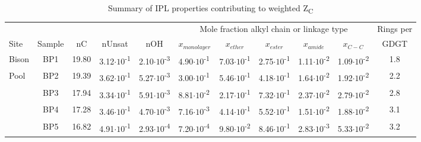 \begin{landscape}
\singlespace

\begin{table}
\centering
\normalsize
\begin{adjustbox}{width=600pt,keepaspectratio}
\begin{threeparttable}
  \caption{Summary of IPL properties contributing to weighted Z\textsubscript{C}}
  

\begin{tabular}{lccccllcccc}
\toprule
      &       &       &       &       & \multicolumn{5}{c}{Mole fraction alkyl chain or linkage type} & Rings per \\
\cmidrule{6-10}Site  & Sample & nC    & nUnsat & nOH   & \multicolumn{1}{c}{$x_{monolayer}$} & \multicolumn{1}{c}{$x_{ether}$} & $x_{ester}$ & $x_{amide}$ & $x_{C-C}$ & GDGT \\
\midrule
Bison & BP1   & 19.80 & 3.12$\cdot 10$\textsuperscript{-1} & 2.10$\cdot 10$\textsuperscript{-3} & 4.90$\cdot 10$\textsuperscript{-1} & 7.03$\cdot 10$\textsuperscript{-1} & 2.75$\cdot 10$\textsuperscript{-1} & 1.11$\cdot 10$\textsuperscript{-2} & 1.09$\cdot 10$\textsuperscript{-2} & 1.8 \\
Pool  & BP2   & 19.39 & 3.62$\cdot 10$\textsuperscript{-1} & 5.27$\cdot 10$\textsuperscript{-3} & 3.00$\cdot 10$\textsuperscript{-1} & 5.46$\cdot 10$\textsuperscript{-1} & 4.18$\cdot 10$\textsuperscript{-1} & 1.64$\cdot 10$\textsuperscript{-2} & 1.92$\cdot 10$\textsuperscript{-2} & 2.2 \\
      & BP3   & 17.94 & 3.34$\cdot 10$\textsuperscript{-1} & 5.91$\cdot 10$\textsuperscript{-3} & 8.81$\cdot 10$\textsuperscript{-2} & 2.17$\cdot 10$\textsuperscript{-1} & 7.32$\cdot 10$\textsuperscript{-1} & 2.37$\cdot 10$\textsuperscript{-2} & 2.79$\cdot 10$\textsuperscript{-2} & 2.8 \\
      & BP4   & 17.28 & 3.46$\cdot 10$\textsuperscript{-1} & 4.70$\cdot 10$\textsuperscript{-3} & 7.16$\cdot 10$\textsuperscript{-3} & 4.14$\cdot 10$\textsuperscript{-1} & 5.52$\cdot 10$\textsuperscript{-1} & 1.51$\cdot 10$\textsuperscript{-2} & 1.88$\cdot 10$\textsuperscript{-2} & 3.1 \\
      & BP5   & 16.82 & 4.91$\cdot 10$\textsuperscript{-1} & 2.93$\cdot 10$\textsuperscript{-4} & 7.20$\cdot 10$\textsuperscript{-4} & 9.80$\cdot 10$\textsuperscript{-2} & 8.46$\cdot 10$\textsuperscript{-1} & 2.83$\cdot 10$\textsuperscript{-3} & 5.33$\cdot 10$\textsuperscript{-2} & 3.2 \\

\end{tabular}
\end{threeparttable}
\end{adjustbox}
\end{table}
\end{landscape}
